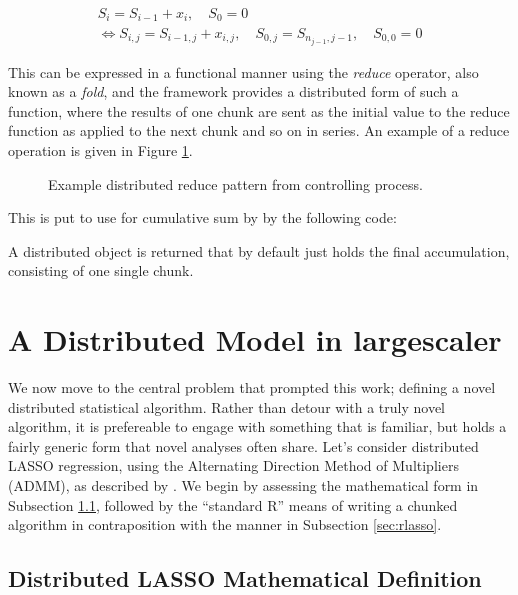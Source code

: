 \documentclass[letterpaper, inpress]{jds} %
\begin{document}
\begin{equation}
\begin{gathered}\label{eqn:cumsum}
    S_i = S_{i-1}+x_i, \quad S_0 = 0\\
    \iff S_{i,j} = S_{i-1,j} + x_{i,j}, \quad S_{0,j} = S_{n_{j-1},j-1}, \quad S_{0,0} = 0
\end{gathered}
\end{equation}

This can be expressed in a functional manner using the \textit{reduce} operator, also known as a \textit{fold}, and the  framework provides a distributed form of such a function, where the results of one chunk are sent as the initial value to the reduce function as applied to the next chunk and so on in series.
An example of a reduce operation is given in Figure \ref{fig:dreduce}.

\begin{figure}[ht]
\begin{center}
    
\caption{Example distributed reduce pattern from controlling process.}
\label{fig:dreduce}
\end{center}
\end{figure}

This is put to use for cumulative sum by  by the following code:


A distributed object is returned that by default just holds the final accumulation, consisting of one single chunk.

\section{A Distributed Model in largescaler}

We now move to the central problem that prompted this work; defining a novel distributed statistical algorithm.
Rather than detour with a truly novel algorithm, it is prefereable to engage with something that is familiar, but holds a fairly generic form that novel analyses often share.
Let's consider distributed LASSO regression, using the Alternating Direction Method of Multipliers (ADMM), as described by \citet{mateos2010}.
We begin by assessing the mathematical form in Subsection \ref{sec:mathlasso}, followed by the ``standard R'' means of writing a chunked algorithm in contraposition with the  manner in Subsection \ref{sec:rlasso}.

\subsection{Distributed LASSO Mathematical Definition}\label{sec:mathlasso}
\end{document}
